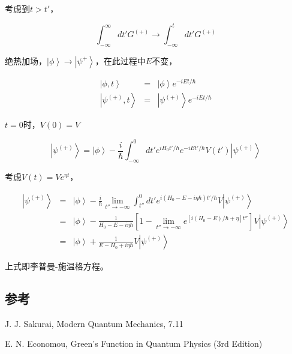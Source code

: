 考虑到$t> t'$，

\begin{equation}
\int_{- \infty}^{\infty} dt' G^{(+)} \to \int_{- \infty}^t dt' G^{(+)} 
\end{equation}

绝热加场，$\left| \phi \right\rangle \to \left| \psi^+ \right\rangle$，在此过程中$E$不变，

\begin{eqnarray}
\left| \phi, t \right\rangle & = & \left| \phi \right\rangle e^{- i Et / \hbar} \\
\left| \psi^{(+)}, t \right\rangle & = & \left| \psi^{(+)} \right\rangle e^{- i Et / \hbar}
\end{eqnarray}

$t = 0$时，$V(0) = V$

\begin{equation}
\left| \psi^{(+)} \right\rangle = \left| \phi \right\rangle - \frac{i }{\hbar} \int_{- \infty}^0 dt' e^{i H_0 t' / \hbar } e^{ - i Et' / \hbar } V(t') \left| \psi^{(+)} \right\rangle 
\end{equation}

考虑$V(t) = V e^{\eta t}$，

\begin{eqnarray*}
\left| \psi^{(+)} \right\rangle  & = & \left| \phi \right\rangle - \frac{i }{\hbar} \lim\limits_{t'' \to - \infty } \int_{t''}^0 dt' e^{i ( H_0 - E - i \eta \hbar ) t' / \hbar } V \left| \psi^{(+) } \right\rangle \\
{} & = & \left| \phi \right\rangle - \frac{1}{H_0 - E - i \eta \hbar} \left[ 1 - \lim\limits_{t'' \to -\infty } e^{[ i(H_0 - E)/ \hbar + \eta  ] t''}  \right] V \left| \psi^{(+)} \right\rangle \\
{} & = & \left| \phi \right\rangle + \frac{1}{E - H_0 + i \eta \hbar} V \left| \psi^{(+)} \right\rangle
\end{eqnarray*}

上式即李普曼-施温格方程。


\subsection*{参考}

J. J. Sakurai, Modern Quantum Mechanics, 7.11

E. N. Economou, Green's Function in Quantum Physics (3rd Edition) 